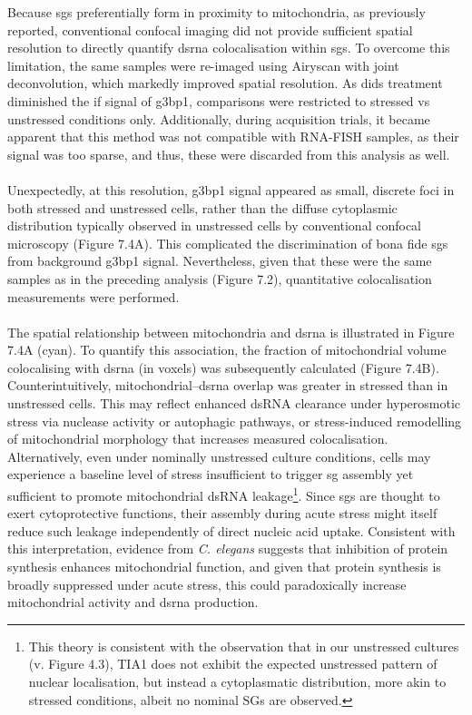 Because \glspl{sg} preferentially form in proximity to mitochondria, as previously reported\cite{amen_stress_2021, fung_production_2013}, conventional confocal imaging did not provide sufficient spatial resolution to directly quantify \gls{dsrna} colocalisation within \glspl{sg}. To overcome this limitation, the same samples were re-imaged using Airyscan with joint deconvolution, which markedly improved spatial resolution. As \gls{dids} treatment diminished the \gls{if} signal of \gls{g3bp1}, comparisons were restricted to stressed \gls{vs} unstressed conditions only. Additionally, during acquisition trials, it became apparent that this method was not compatible with RNA-FISH samples, as their signal was too sparse, and thus, these were discarded from this analysis as well.
\\
\\
Unexpectedly, at this resolution, \gls{g3bp1} signal appeared as small, discrete foci in both stressed and unstressed cells, rather than the diffuse cytoplasmic distribution typically observed in unstressed cells by conventional confocal microscopy (Figure 7.4A). This complicated the discrimination of bona fide \glspl{sg} from background \gls{g3bp1} signal. Nevertheless, given that these were the same samples as in the preceding analysis (Figure 7.2), quantitative colocalisation measurements were performed.
\\
\\
The spatial relationship between mitochondria and \gls{dsrna} is illustrated in Figure 7.4A (cyan). To quantify this association, the fraction of mitochondrial volume colocalising with \gls{dsrna} (in voxels) was subsequently calculated (Figure 7.4B). Counterintuitively, mitochondrial–\gls{dsrna} overlap was greater in stressed than in unstressed cells. This may reflect enhanced dsRNA clearance under hyperosmotic stress via nuclease activity or autophagic pathways, or stress-induced remodelling of mitochondrial morphology that increases measured colocalisation. Alternatively, even under nominally unstressed culture conditions, cells may experience a baseline level of stress insufficient to trigger \gls{sg} assembly yet sufficient to promote mitochondrial dsRNA leakage\footnote{This theory is consistent with the observation that in our unstressed cultures (v. Figure 4.3), TIA1 does not exhibit the expected unstressed pattern of nuclear localisation, but instead a cytoplasmatic distribution, more akin to stressed conditions, albeit no nominal SGs are observed.}. Since \glspl{sg} are thought to exert cytoprotective functions\cite{paget_stress_2023}, their assembly during acute stress might itself reduce such leakage independently of direct nucleic acid uptake. Consistent with this interpretation, evidence from \textit{C. elegans} suggests that inhibition of protein synthesis enhances mitochondrial function\cite{mallick_amp_2025}, and given that protein synthesis is broadly suppressed under acute stress\cite{kedersha_g3bpcaprin1usp10_2016}, this could paradoxically increase mitochondrial activity and \gls{dsrna} production.
